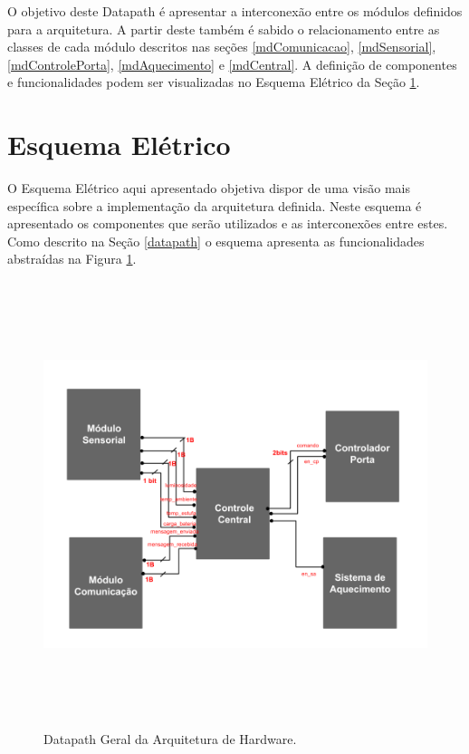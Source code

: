 \documentclass{report}
\begin{document}
	O objetivo deste Datapath é apresentar a interconexão entre os módulos definidos para a arquitetura. A partir deste também é sabido o 
	relacionamento entre as classes de cada módulo descritos nas seções {\ref{mdComunicacao}}, {\ref{mdSensorial}}, {\ref{mdControlePorta}},
	{\ref{mdAquecimento}} e {\ref{mdCentral}}. A definição de componentes e funcionalidades podem ser visualizadas no Esquema Elétrico
	da Seção {\ref{esquema}}. 
	
     \section{Esquema Elétrico}\label{esquema}
    
	O Esquema Elétrico aqui apresentado objetiva dispor de uma visão mais específica sobre a implementação da arquitetura definida. Neste esquema é apresentado
	os componentes que serão utilizados e as interconexões entre estes. Como descrito na Seção {\ref{datapath}} o esquema apresenta as funcionalidades abstraídas 
	na Figura \ref{figure:datapath_geral}. 
    
	
      \begin{landscape}
	\begin{figure}[!h]
	  \begin{center}
	    \includegraphics[width=\linewidth, height = 13cm]{pictures/data_path.png}
	    \caption{Datapath Geral da Arquitetura de Hardware.}
	    \label{figure:datapath_geral}
	  \end{center}
	\end{figure}
      \end{landscape}
   
\end{document}
